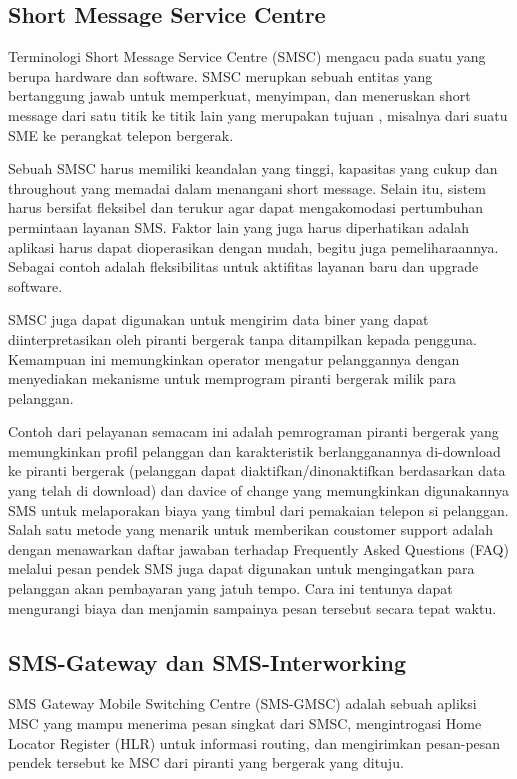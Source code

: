 \documentclass{jtetiproposalskripsi}
\begin{document}
\subsection{Short Message Service Centre}
Terminologi Short Message Service Centre (SMSC) mengacu pada suatu yang berupa hardware dan software. SMSC merupkan sebuah entitas yang bertanggung jawab untuk memperkuat, menyimpan, dan meneruskan short message dari satu titik ke titik lain yang merupakan tujuan , misalnya dari suatu SME ke perangkat telepon bergerak. 

Sebuah SMSC harus memiliki keandalan yang tinggi, kapasitas yang cukup dan throughout yang memadai dalam menangani short message. Selain itu, sistem harus bersifat fleksibel dan terukur agar dapat mengakomodasi pertumbuhan permintaan layanan  SMS. Faktor lain yang juga harus diperhatikan adalah aplikasi harus dapat dioperasikan dengan mudah, begitu juga pemeliharaannya. Sebagai contoh adalah fleksibilitas untuk aktifitas layanan baru dan upgrade software.

SMSC juga dapat digunakan untuk mengirim data biner yang dapat diinterpretasikan oleh piranti bergerak tanpa ditampilkan kepada pengguna. Kemampuan ini memungkinkan operator mengatur pelanggannya dengan menyediakan mekanisme untuk memprogram piranti bergerak milik para pelanggan.

Contoh dari pelayanan semacam ini adalah pemrograman piranti bergerak yang memungkinkan profil pelanggan dan karakteristik berlangganannya di-download ke piranti bergerak  (pelanggan dapat diaktifkan/dinonaktifkan berdasarkan data yang telah di download) dan davice of change yang memungkinkan digunakannya SMS untuk melaporakan biaya yang timbul dari pemakaian telepon si pelanggan. Salah satu metode yang menarik untuk memberikan coustomer support adalah dengan menawarkan daftar jawaban terhadap Frequently Asked Questions (FAQ) melalui pesan pendek SMS juga dapat digunakan untuk mengingatkan para pelanggan  akan pembayaran yang jatuh tempo. Cara ini tentunya dapat mengurangi biaya dan menjamin sampainya pesan tersebut secara tepat waktu.

\subsection{SMS-Gateway dan SMS-Interworking}
SMS Gateway Mobile Switching Centre (SMS-GMSC) adalah sebuah apliksi MSC yang mampu menerima pesan singkat dari SMSC, mengintrogasi Home Locator Register (HLR) untuk informasi routing, dan mengirimkan pesan-pesan pendek tersebut ke MSC dari piranti yang bergerak yang dituju.
\end{document}

